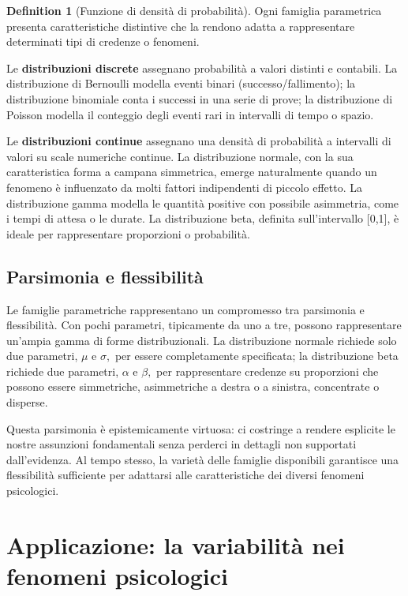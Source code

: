 \documentclass[
  letterpaper,
  DIV=11,
  numbers=noendperiod,
  oneside]{scrreprt}
\theoremstyle{definition}
\theoremstyle{plain}
\theoremstyle{definition}
\newtheorem{definition}{Definition}[chapter]
\theoremstyle{remark}
\begin{document}
\begin{definition}[Funzione di densità di
probabilità]
Ogni famiglia parametrica presenta caratteristiche distintive che la
rendono adatta a rappresentare determinati tipi di credenze o fenomeni.

Le \textbf{distribuzioni discrete} assegnano probabilità a valori
distinti e contabili. La distribuzione di Bernoulli modella eventi
binari (successo/fallimento); la distribuzione binomiale conta i
successi in una serie di prove; la distribuzione di Poisson modella il
conteggio degli eventi rari in intervalli di tempo o spazio.

Le \textbf{distribuzioni continue} assegnano una densità di probabilità
a intervalli di valori su scale numeriche continue. La distribuzione
normale, con la sua caratteristica forma a campana simmetrica, emerge
naturalmente quando un fenomeno è influenzato da molti fattori
indipendenti di piccolo effetto. La distribuzione gamma modella le
quantità positive con possibile asimmetria, come i tempi di attesa o le
durate. La distribuzione beta, definita sull'intervallo {[}0,1{]}, è
ideale per rappresentare proporzioni o probabilità.

\subsection{Parsimonia e
flessibilità}\label{parsimonia-e-flessibilituxe0}

Le famiglie parametriche rappresentano un compromesso tra parsimonia e
flessibilità. Con pochi parametri, tipicamente da uno a tre, possono
rappresentare un'ampia gamma di forme distribuzionali. La distribuzione
normale richiede solo due parametri, \(\mu\) e \(\sigma,\) per essere
completamente specificata; la distribuzione beta richiede due parametri,
\(\alpha\) e \(\beta,\) per rappresentare credenze su proporzioni che
possono essere simmetriche, asimmetriche a destra o a sinistra,
concentrate o disperse.

Questa parsimonia è epistemicamente virtuosa: ci costringe a rendere
esplicite le nostre assunzioni fondamentali senza perderci in dettagli
non supportati dall'evidenza. Al tempo stesso, la varietà delle famiglie
disponibili garantisce una flessibilità sufficiente per adattarsi alle
caratteristiche dei diversi fenomeni psicologici.

\section{Applicazione: la variabilità nei fenomeni
psicologici}\label{applicazione-la-variabilituxe0-nei-fenomeni-psicologici}


\end{definition}
\end{document}
